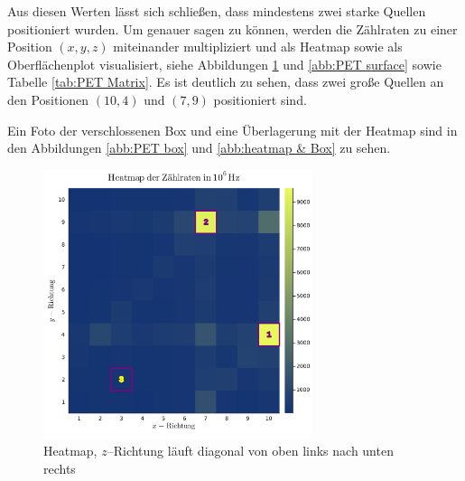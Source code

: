\documentclass[12pt,a4paper]{scrartcl}
\numberwithin{equation}{section} %
\begin{document}
Aus diesen Werten lässt sich schließen, dass mindestens zwei starke Quellen positioniert wurden. Um genauer sagen zu können, werden die Zählraten zu einer Position $(x,y,z)$ miteinander multipliziert und als Heatmap sowie als Oberflächenplot visualisiert, siehe Abbildungen \ref{abb:PET heatmap} und \ref{abb:PET surface} sowie Tabelle \ref{tab:PET Matrix}. Es ist deutlich zu sehen, dass zwei große Quellen an den Positionen $(10,4)$ und $(7,9)$ positioniert sind.

Ein Foto der verschlossenen Box und eine Überlagerung mit der Heatmap sind in den Abbildungen \ref{abb:PET box} und \ref{abb:heatmap & Box} zu sehen.

\begin{figure}[b!]
	\centering
	\includegraphics[width=0.7\textwidth]{../media/B3.4/heatmap.png}
	\caption{Heatmap, $z$--Richtung läuft diagonal von oben links nach unten rechts}
	\label{abb:PET heatmap}
\end{figure}
\end{document}
